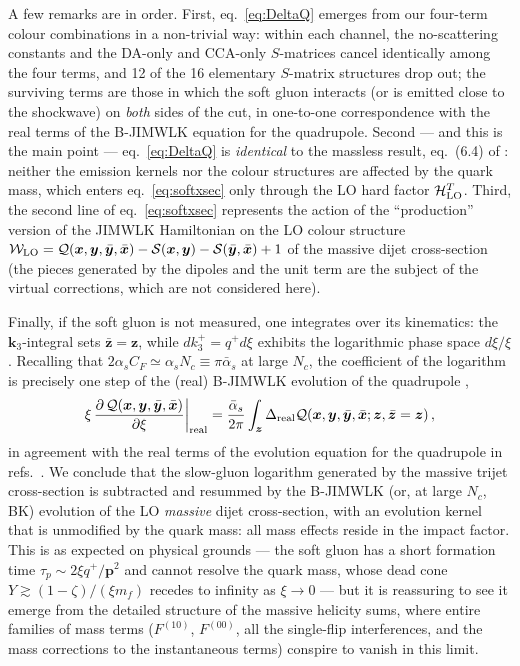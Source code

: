 \documentclass[11pt,a4paper]{article}
\newcommand{\calH}{\mathcal{H}}
\newcommand{\calW}{\mathcal{W}}
\newcommand{\calQ}{\mathcal{Q}}
\newcommand{\calS}{\mathcal{S}}
\newcommand{\vx}{\bm{x}}
\newcommand{\vy}{\bm{y}}
\newcommand{\vz}{\bm{z}}
\newcommand{\vxb}{\bar{\bm{x}}}
\newcommand{\vyb}{\bar{\bm{y}}}
\newcommand{\vzb}{\bar{\bm{z}}}
\newcommand{\vk}{\bm{k}}
\newcommand{\vp}{\bm{p}}
\numberwithin{equation}{section}
\begin{document}
A few remarks are in order. First, eq.~\eqref{eq:DeltaQ} emerges from our four-term colour
combinations in a non-trivial way: within each channel, the no-scattering constants and the
DA-only and CCA-only $S$-matrices cancel identically among the four terms, and 12 of the 16
elementary $S$-matrix structures drop out; the surviving terms are those in which the soft
gluon interacts (or is emitted close to the shockwave) on \emph{both} sides of the cut, in
one-to-one correspondence with the real terms of the B-JIMWLK equation for the quadrupole.
Second --- and this is the main point --- eq.~\eqref{eq:DeltaQ} is \emph{identical} to the
massless result, eq.~(6.4) of \cite{Iancu:2022gpw}: neither the emission kernels nor the
colour structures are affected by the quark mass, which enters eq.~\eqref{eq:softxsec} only
through the LO hard factor $\calH^{T}_{\rm LO}$. Third, the second line of
eq.~\eqref{eq:softxsec} represents the action of the ``production'' version of the JIMWLK
Hamiltonian \cite{JalilianMarian:2004da,Kovner:2006wr,Iancu:2013uva} on the LO colour
structure $\calW_{\rm LO}=\calQ(\vx,\vy,\vyb,\vxb)-\calS(\vx,\vy)-\calS(\vyb,\vxb)+1$ of the
massive dijet cross-section (the pieces generated by the dipoles and the unit term are the
subject of the virtual corrections, which are not considered here).

Finally, if the soft gluon is not measured, one integrates over its kinematics: the
$\vk_{3}$-integral sets $\vzb=\vz$, while $dk^{+}_{3}=q^{+}d\xi$ exhibits the logarithmic
phase space $d\xi/\xi$. Recalling that $2\alpha_sC_F\simeq\alpha_sN_c\equiv\pi\bar\alpha_s$
at large $N_c$, the coefficient of the logarithm is precisely one step of the (real)
B-JIMWLK evolution of the quadrupole \cite{JalilianMarian:2004da,Dominguez:2011gc,Iancu:2011ns},
\begin{align}
\label{eq:BJIMWLK}
\xi\,\frac{\partial\,\calQ(\vx,\vy,\vyb,\vxb)}{\partial \xi}\bigg|_{\rm real} =
\frac{\bar{\alpha}_{s}}{2\pi}\int_{\vz}
\Delta_{\rm real}\calQ(\vx,\vy,\vyb,\vxb;\vz,\vzb=\vz)\,,
\end{align}
in agreement with the real terms of the evolution equation for the quadrupole in
refs.~\cite{JalilianMarian:2004da,Dominguez:2011gc}. We conclude that the slow-gluon
logarithm generated by the massive trijet cross-section is subtracted and resummed by the
B-JIMWLK (or, at large $N_c$, BK) evolution of the LO \emph{massive} dijet cross-section,
with an evolution kernel that is unmodified by the quark mass: all mass effects reside in
the impact factor. This is as expected on physical grounds --- the soft gluon has a short
formation time $\tau_p\sim2\xi q^{+}/\vp^{2}$ and cannot resolve the quark mass, whose dead
cone $Y\gtrsim(1-\zeta)/(\xi m_f)$ recedes to infinity as $\xi\to0$ --- but it is reassuring
to see it emerge from the detailed structure of the massive helicity sums, where entire
families of mass terms ($F^{(10)}$, $F^{(00)}$, all the single-flip interferences, and the
mass corrections to the instantaneous terms) conspire to vanish in this limit.
\end{document}
